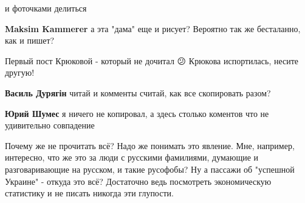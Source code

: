 \begin{itemize}
\begin{itemize}
и фоточками делиться 🥰

 
\textbf{Maksim Kammerer} а эта "дама" еще и рисует? Вероятно так же бесталанно, как и пишет?
\end{itemize}

 

Первый пост Крюковой - который не дочитал 😕 Крюкова испортилась, несите
другую!

\begin{itemize}
 
\textbf{Василь Дурягін} читай и комменты считай, как все скопировать разом?

 
\textbf{Юрий Шумес} я ничего не копировал, а здесь столько коментов что не удивительно совпадение 🤔

 
Почему же не прочитать всё? Надо же понимать это явление. Мне, например, интересно, что же это за люди с русскими фамилиями, думающие и разговаривающие на русском, и такие русофобы? Ну а пассажи об "успешной Украине" - откуда это всё? Достаточно ведь посмотреть экономическую статистику и не писать никогда эти глупости.

 

\end{itemize}
\end{itemize}
